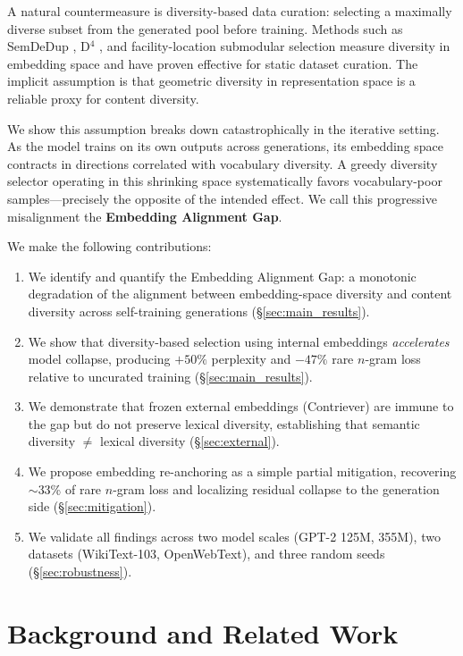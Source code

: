 \documentclass[11pt,a4paper]{article}
\begin{document}
A natural countermeasure is diversity-based data curation: selecting a maximally diverse subset from the generated pool before training.
Methods such as SemDeDup \cite{abbas2023semdedup}, D$^4$ \cite{tirumala2023d4}, and facility-location submodular selection \cite{kirchhoff2014submodular} measure diversity in embedding space and have proven effective for static dataset curation.
The implicit assumption is that geometric diversity in representation space is a reliable proxy for content diversity.

We show this assumption breaks down catastrophically in the iterative setting.
As the model trains on its own outputs across generations, its embedding space contracts in directions correlated with vocabulary diversity.
A greedy diversity selector operating in this shrinking space systematically favors vocabulary-poor samples---precisely the opposite of the intended effect.
We call this progressive misalignment the \textbf{Embedding Alignment Gap}.

We make the following contributions:
\begin{enumerate}
\item We identify and quantify the Embedding Alignment Gap: a monotonic degradation of the alignment between embedding-space diversity and content diversity across self-training generations (\S\ref{sec:main_results}).
\item We show that diversity-based selection using internal embeddings \emph{accelerates} model collapse, producing $+50\%$ perplexity and $-47\%$ rare $n$-gram loss relative to uncurated training (\S\ref{sec:main_results}).
\item We demonstrate that frozen external embeddings (Contriever) are immune to the gap but do not preserve lexical diversity, establishing that semantic diversity $\neq$ lexical diversity (\S\ref{sec:external}).
\item We propose embedding re-anchoring as a simple partial mitigation, recovering $\sim$33\% of rare $n$-gram loss and localizing residual collapse to the generation side (\S\ref{sec:mitigation}).
\item We validate all findings across two model scales (GPT-2 125M, 355M), two datasets (WikiText-103, OpenWebText), and three random seeds (\S\ref{sec:robustness}).
\end{enumerate}

\section{Background and Related Work}
\label{sec:related}
\end{document}

